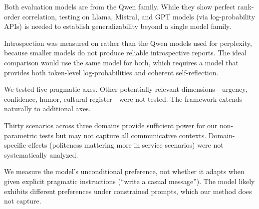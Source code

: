  Both evaluation models are from the Qwen family. While they show perfect rank-order correlation, testing on Llama, Mistral, and GPT models (via log-probability APIs) is needed to establish generalizability beyond a single model family.

 Introspection was measured on \gptfour rather than the Qwen models used for perplexity, because smaller models do not produce reliable introspective reports. The ideal comparison would use the same model for both, which requires a model that provides both token-level log-probabilities and coherent self-reflection.

 We tested five pragmatic axes. Other potentially relevant dimensions---urgency, confidence, humor, cultural register---were not tested. The framework extends naturally to additional axes.

 Thirty scenarios across three domains provide sufficient power for our non-parametric tests but may not capture all communicative contexts. Domain-specific effects (\eg politeness mattering more in service scenarios) were not systematically analyzed.

 We measure the model's unconditional preference, not whether it adapts when given explicit pragmatic instructions (\eg ``write a casual message''). The model likely exhibits different preferences under constrained prompts, which our method does not capture.
